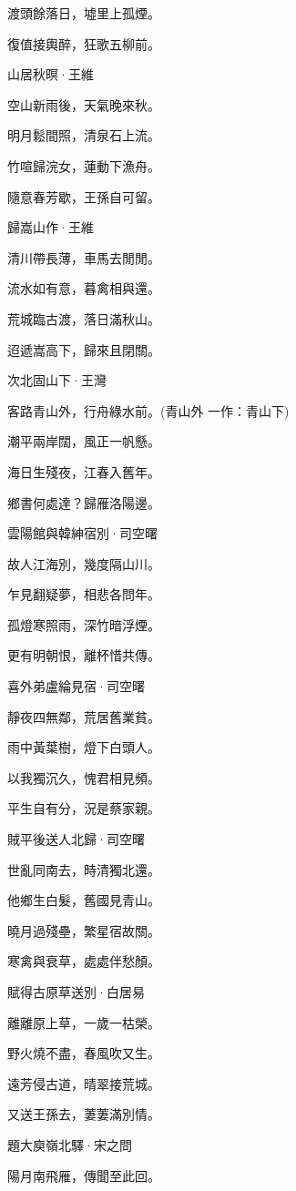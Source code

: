 \documentclass[12pt,a4paper]{ctexbook}
\begin{document}
渡頭餘落日，墟里上孤煙。\par
復值接輿醉，狂歌五柳前。\par
山居秋暝·王維\par
空山新雨後，天氣晚來秋。\par
明月鬆間照，清泉石上流。\par
竹喧歸浣女，蓮動下漁舟。\par
隨意春芳歇，王孫自可留。\par
歸嵩山作·王維\par
清川帶長薄，車馬去閒閒。\par
流水如有意，暮禽相與還。\par
荒城臨古渡，落日滿秋山。\par
迢遞嵩高下，歸來且閉關。\par
次北固山下·王灣\par
客路青山外，行舟綠水前。(青山外 一作：青山下)\par
潮平兩岸闊，風正一帆懸。\par
海日生殘夜，江春入舊年。\par
鄉書何處達？歸雁洛陽邊。\par
雲陽館與韓紳宿別·司空曙\par
故人江海別，幾度隔山川。\par
乍見翻疑夢，相悲各問年。\par
孤燈寒照雨，深竹暗浮煙。\par
更有明朝恨，離杯惜共傳。\par
喜外弟盧綸見宿·司空曙\par
靜夜四無鄰，荒居舊業貧。\par
雨中黃葉樹，燈下白頭人。\par
以我獨沉久，愧君相見頻。\par
平生自有分，況是蔡家親。\par
賊平後送人北歸·司空曙\par
世亂同南去，時清獨北還。\par
他鄉生白髮，舊國見青山。\par
曉月過殘壘，繁星宿故關。\par
寒禽與衰草，處處伴愁顏。\par
賦得古原草送別·白居易\par
離離原上草，一歲一枯榮。\par
野火燒不盡，春風吹又生。\par
遠芳侵古道，晴翠接荒城。\par
又送王孫去，萋萋滿別情。\par
題大庾嶺北驛·宋之問\par
陽月南飛雁，傳聞至此回。\par
\end{document}
